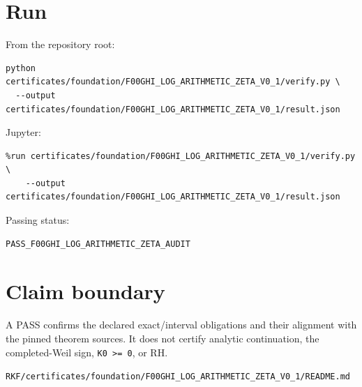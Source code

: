 \hypertarget{run}{%
\section{Run}\label{run}}

From the repository root:

\begin{verbatim}
python certificates/foundation/F00GHI_LOG_ARITHMETIC_ZETA_V0_1/verify.py \
  --output certificates/foundation/F00GHI_LOG_ARITHMETIC_ZETA_V0_1/result.json
\end{verbatim}

Jupyter:

\begin{verbatim}
%run certificates/foundation/F00GHI_LOG_ARITHMETIC_ZETA_V0_1/verify.py \
    --output certificates/foundation/F00GHI_LOG_ARITHMETIC_ZETA_V0_1/result.json
\end{verbatim}

Passing status:

\begin{verbatim}
PASS_F00GHI_LOG_ARITHMETIC_ZETA_AUDIT
\end{verbatim}

\hypertarget{claim-boundary}{%
\section{Claim boundary}\label{claim-boundary}}

A PASS confirms the declared exact/interval obligations and their alignment with the pinned theorem sources. It does not certify analytic continuation, the completed-Weil sign, \texttt{K0\ \textgreater{}=\ 0}, or RH.

\begin{flushright}\small\texttt{RKF/certificates/foundation/F00GHI\_LOG\_ARITHMETIC\_ZETA\_V0\_1/README.md}\end{flushright}
